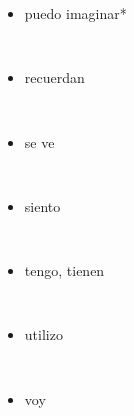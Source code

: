 \documentclass{article}
\begin{document}
\begin{itemize}
\begin{verbatim}
        \end{verbatim}
        \item puedo imaginar*
        \begin{verbatim}
            
        \end{verbatim}
        \item recuerdan
        \begin{verbatim}
            
        \end{verbatim}
        \item se ve
        \begin{verbatim}
            
        \end{verbatim}
        \item siento
        \begin{verbatim}
            
        \end{verbatim}
        \item tengo, tienen
        \begin{verbatim}
            
        \end{verbatim}
        \item utilizo
        \begin{verbatim}
            
        \end{verbatim}
        \item voy
        \begin{verbatim}
            
        \end{verbatim}
    \end{itemize}
\end{document}
